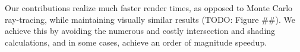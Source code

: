 Our contributions realize much faster render times, as opposed to Monte Carlo ray-tracing, while maintaining visually similar results (TODO: Figure \#\#). We achieve this by avoiding the numerous and costly intersection and shading calculations, and in some cases, achieve an order of magnitude speedup.



